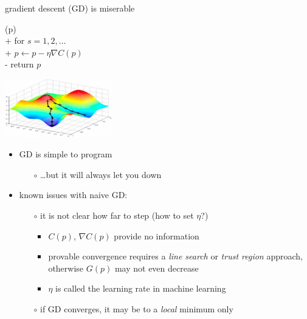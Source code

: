 \documentclass[xcolor={svgnames},
               hyperref={colorlinks,citecolor=DeepPink4,linkcolor=FireBrick,urlcolor=Maroon}]
               {beamer}
\newcommand{\grad}{\nabla}
\begin{document}
\begin{frame}{gradient descent (GD) is miserable}

\begin{pseudo*}
(p)\text{:} \\+
    for $s = 1,2,\dots$ \\+
        $p \gets p - \eta \grad C(p)$ \\-
    return $p$
\end{pseudo*}

\vspace{-25mm}
\hfill \includegraphics[width=0.35\textwidth]{figs/gdsurface} \phantom{adslj}

\medskip
\begin{itemize}
\item GD is simple to program
    \begin{itemize}
    \item[$\circ$] \dots but it will always let you down
    \end{itemize}
\item known issues with naive GD:
    \begin{itemize}
    \item[$\circ$] it is not clear how far to step \hfill (how to set $\eta$?)
        \begin{itemize}
        \item $C(p)$, $\grad C(p)$ provide no information
        \item provable convergence requires a \emph{line search} or \emph{trust region} approach,  otherwise $G(p)$ may not even decrease
        \item $\eta$ is called the \alert{learning rate} in machine learning
        \end{itemize}
    \item[$\circ$] if GD converges, it may be to a \emph{local} minimum only
    \end{itemize}
\end{itemize}
\end{frame}
\end{document}
